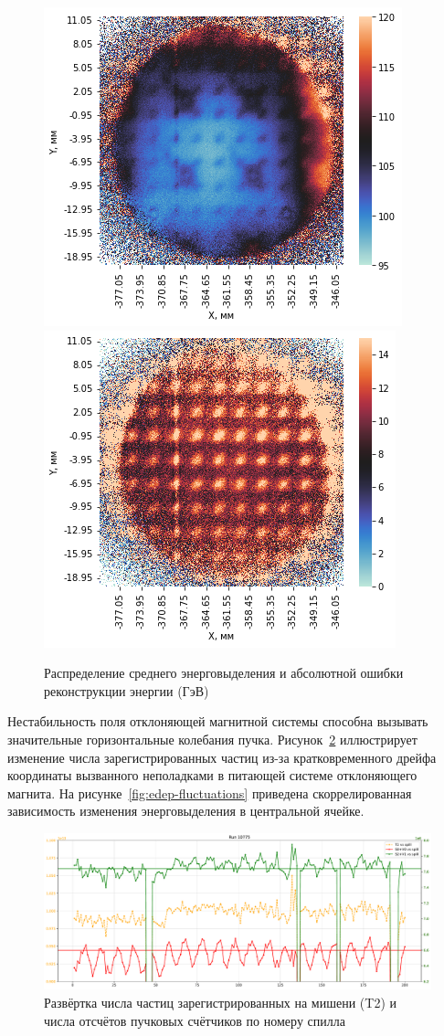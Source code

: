 \begin{figure}
    \centering
    \includegraphics[width=0.45\linewidth]{images//illustrative/image.png}
    \includegraphics[width=0.45\linewidth]{images//illustrative/ecal-beam-error.png}
    \caption{Распределение среднего энерговыделения и
    абсолютной ошибки реконструкции энергии (ГэВ)}
    \label{fig:ecal-cell-nonhomo}
\end{figure}

Нестабильность поля отклоняющей магнитной системы способна вызывать
значительные горизонтальные колебания пучка. Рисунок~\ref{fig:counts-fluctuating}
иллюстрирует изменение числа зарегистрированных частиц из-за
кратковременного дрейфа координаты вызванного неполадками в питающей
системе отклоняющего магнита. На рисунке~\ref{fig:edep-fluctuations} приведена
скоррелированная зависимость изменения энерговыделения в центральной ячейке.

\begin{figure}
    \centering
    \includegraphics[width=0.95\linewidth]{images/illustrative/run-10775-t2-s0pv0-s2pv1.pdf}
    \caption{Развёртка числа частиц зарегистрированных на мишени (T2) и
    числа отсчётов пучковых счётчиков по номеру спилла}
    \label{fig:counts-fluctuating}
\end{figure}

